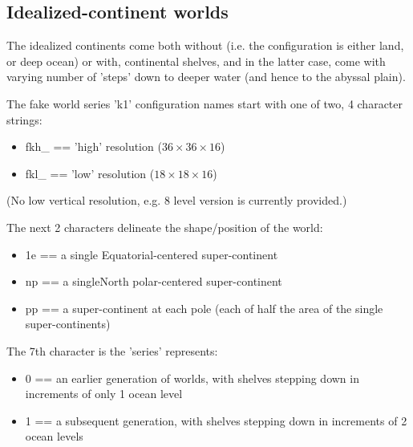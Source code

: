 \documentclass[11pt,fleqn]{book} %
\begin{document}
%
\subsection{Idealized-continent worlds}

The idealized continents come both without (i.e. the configuration is either land, or deep ocean) or with, continental shelves, and in the latter case, come with varying number of 'steps' down to deeper water (and hence to the abyssal plain).

The fake world series 'k1' configuration names start with one of two, 4 character strings:
\begin{itemize}[noitemsep]
\vspace{1mm}
\item \textsf{\footnotesize fkh\_} == 'high' resolution (\(36\times36\times16\))
\item \textsf{\footnotesize fkl\_} == 'low' resolution (\(18\times18\times16\))
\end{itemize}
\vspace{1mm}
\noindent (No low vertical resolution, e.g. \(8\) level version is currently provided.)
\vspace{1mm}

The next 2 characters delineate the shape/position of the world:
\begin{itemize}[noitemsep]
\vspace{1mm}
\item \textsf{\footnotesize 1e} == a single Equatorial-centered super-continent
\item \textsf{\footnotesize np} == a singleNorth polar-centered super-continent
\item \textsf{\footnotesize pp} == a super-continent at each pole (each of half the area of the single super-continents)
\end{itemize}
\vspace{2mm}

The 7th character is the 'series' represents:
\begin{itemize}[noitemsep]
\vspace{1mm}
\item \textsf{\footnotesize 0} == an earlier generation of worlds, with shelves stepping down in increments of only 1 ocean level
\vspace{1mm}
\item \textsf{\footnotesize 1} == a subsequent generation, with shelves stepping down in increments of 2 ocean levels
\end{itemize}
\vspace{2mm}
\end{document}
